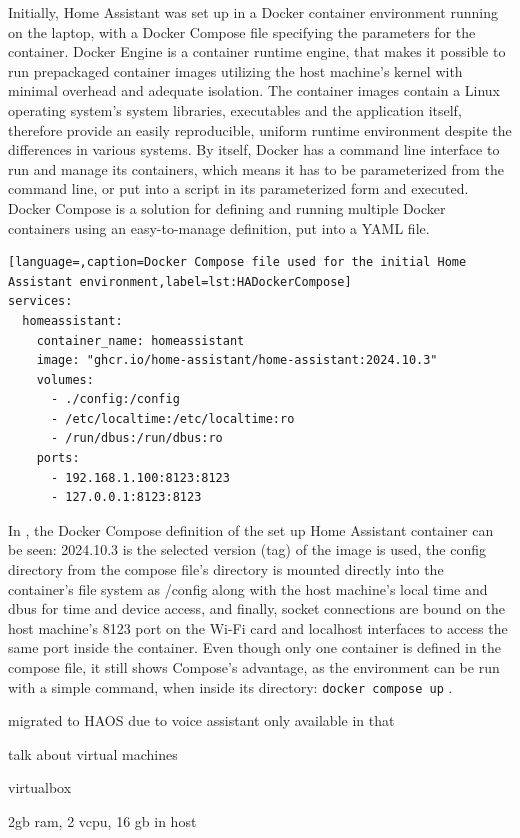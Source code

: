Initially, Home Assistant was set up in a Docker container environment running on the laptop, with a Docker Compose file specifying the parameters for the container. Docker Engine is a container runtime engine, that makes it possible to run prepackaged container images utilizing the host machine's kernel with minimal overhead and adequate isolation. \cite{DockerContainer} The container images contain a Linux operating system's system libraries, executables and the application itself, therefore provide an easily reproducible, uniform runtime environment despite the differences in various systems. By itself, Docker has a command line interface to run and manage its containers, which means it has to be parameterized from the command line, or put into a script in its parameterized form and executed. Docker Compose is a solution for defining and running multiple Docker containers using an easy-to-manage definition, put into a YAML file. \cite{DockerCompose}

\begin{lstlisting}[language=,caption=Docker Compose file used for the initial Home Assistant environment,label=lst:HADockerCompose]
services:
  homeassistant:
    container_name: homeassistant
    image: "ghcr.io/home-assistant/home-assistant:2024.10.3"
    volumes:
      - ./config:/config
      - /etc/localtime:/etc/localtime:ro
      - /run/dbus:/run/dbus:ro
    ports:
      - 192.168.1.100:8123:8123
      - 127.0.0.1:8123:8123
\end{lstlisting}

In , the Docker Compose definition of the set up Home Assistant container can be seen: 2024.10.3 is the selected version (tag) of the image is used, the config directory from the compose file's directory is mounted directly into the container's file system as /config along with the host machine's local time and dbus for time and device access, and finally, socket connections are bound on the host machine's 8123 port on the Wi-Fi card and localhost interfaces to access the same port inside the container. Even though only one container is defined in the compose file, it still shows Compose's advantage, as the environment can be run with a simple command, when inside its directory: \verb+docker compose up+ .


migrated to HAOS due to voice assistant only available in that

talk about virtual machines

virtualbox

2gb ram, 2 vcpu, 16 gb in host


